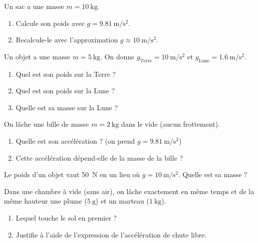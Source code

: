 \documentclass[11pt,a4paper]{article}
\begin{document}

\begin{exo}
Un sac a une masse $m=\qty{10}{\kilogram}$.
\begin{enumerate}[label=\alph*)]
  \item Calcule son poids avec $g=\qty{9,81}{\metre\per\second\squared}$.
  \item Recalcule-le avec l'approximation $g\approx\qty{10}{\metre\per\second\squared}$.
\end{enumerate}
\end{exo}

\begin{exo}
Un objet a une masse $m=\qty{5}{\kilogram}$. On donne $g_{\text{Terre}}=\qty{10}{\metre\per\second\squared}$
et $g_{\text{Lune}}=\qty{1,6}{\metre\per\second\squared}$.
\begin{enumerate}[label=\alph*)]
  \item Quel est son poids sur la Terre ?
  \item Quel est son poids sur la Lune ?
  \item Quelle est sa masse sur la Lune ?
\end{enumerate}
\end{exo}

\begin{exo}
On lâche une bille de masse $m=\qty{2}{\kilogram}$ dans le vide (aucun frottement).
\begin{enumerate}[label=\alph*)]
  \item Quelle est son accélération ? (on prend $g=\qty{9,81}{\metre\per\second\squared}$)
  \item Cette accélération dépend-elle de la masse de la bille ?
\end{enumerate}
\end{exo}

\begin{exo}
Le poids d'un objet vaut \qty{50}{\newton} en un lieu où $g=\qty{10}{\metre\per\second\squared}$.
Quelle est sa masse ?
\end{exo}

\begin{exo}
Dans une chambre à vide (sans air), on lâche exactement en même temps et de la même hauteur une plume
($\qty{5}{\gram}$) et un marteau ($\qty{1}{\kilogram}$).
\begin{enumerate}[label=\alph*)]
  \item Lequel touche le sol en premier ?
  \item Justifie à l'aide de l'expression de l'accélération de chute libre.
\end{enumerate}
\end{exo}
\end{document}
